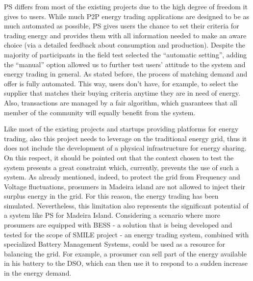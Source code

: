 \ac{PS} differs from most of the existing projects due to the high degree of freedom it gives to users. While much P2P energy trading applications are designed to be as much automated as possible, \ac{PS} gives users the chance to set their criteria for trading energy and provides them with all information needed to make an aware choice (via a detailed feedback about consumption and production). Despite the majority of participants in the field test selected the “automatic setting”, adding the “manual” option allowed us to further test users’ attitude to the system and energy trading in general.
As stated before, the process of matching demand and offer is fully automated. This way, users don’t have, for example, to select the supplier that matches their buying criteria anytime they are in need of energy. Also, transactions are managed by a fair algorithm, which guarantees that all member of the community will equally benefit from the system. 



Like most of the existing projects and startups providing platforms for energy trading, also this project needs to leverage on the traditional energy grid, thus it does not include the development of a physical infrastructure for energy sharing. On this respect, it should be pointed out that the context chosen to test the system presents a great constraint which, currently, prevents the use of such a system. As already mentioned, indeed, to protect the grid from Frequency and Voltage fluctuations, prosumers in Madeira island are not allowed to inject their surplus energy in the grid. For this reason, the energy trading has been simulated. Nevertheless, this limitation also represents the significant potential of a system like \ac{PS} for Madeira Island. Considering a scenario where more prosumers are equipped with \ac{BESS} - a solution that is being developed and tested for the scope of SMILE project - an energy trading system, combined with specialized Battery Management Systems, could be used as a resource for balancing the grid. For example, a prosumer can sell part of the energy available in his battery to the \ac{DSO}, which can then use it to respond to a sudden increase in the energy demand.



